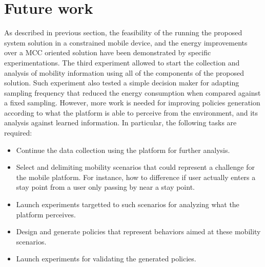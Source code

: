 \documentclass[ENG,PhD]{cinvestav}
\begin{document}
 
%                                                                                               
\section{Future work}\label{sec:future-work}
As described in previous section, the feasibility of the running the proposed system solution in a constrained mobile device, and the energy improvements over a MCC oriented solution have been demonstrated by specific experimentations.
The third experiment allowed to start the collection and analysis of mobility information using all of the components of the proposed solution.
Such experiment also tested a simple decision maker for adapting sampling frequency that reduced the energy consumption when compared against a fixed sampling.
However, more work is needed for improving policies generation according to what the platform is able to perceive from the environment, and its analysis against learned information.
In particular, the following tasks are required:
\begin{itemize}
  \item Continue the data collection using the platform for further analysis.
  \item Select and delimiting mobility scenarios that could represent a challenge for the mobile platform.
  For instance, how to difference if user actually enters a stay point from a user only passing by near a stay point.
  \item Launch experiments targetted to such scenarios for analyzing what the platform perceives.
  \item Design and generate policies that represent behaviors aimed at these mobility scenarios.
  \item Launch experiments for validating the generated policies.
\end{itemize}
\end{document}

